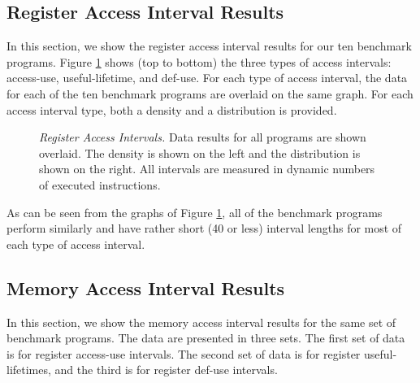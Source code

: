 \documentclass[10pt,dvips]{article}
\begin{document}
\subsection{Register Access Interval Results}
%
In this section, we show the register access interval results for
our ten benchmark programs.
Figure \ref{fig:a_over} shows (top to bottom)
the three types of access intervals:
access-use, useful-lifetime, and def-use.
For each type of access interval, the data for each of the
ten benchmark programs are overlaid on the same graph.
For each access interval type, both a density 
and a distribution is provided.
%
\begin{figure}[tb]
\centering
{}
\caption{{\em Register Access Intervals.} 
Data results for all programs are shown overlaid.
The density is shown on the left and the distribution is shown
on the right.
All intervals are measured in dynamic numbers of executed instructions.}
\label{fig:a_over}
\end{figure}
%
As can be seen from the graphs of Figure \ref{fig:a_over},
all of the benchmark programs perform similarly and have
rather short (40 or less) interval lengths for most of each type
of access interval.
%
%
\subsection{Memory Access Interval Results}
%
In this section, we show the memory access interval results for
the same set of benchmark programs.
The data are presented in three sets.
The first set of data is for register access-use intervals.
The second set of data is for register useful-lifetimes, and
the third is for register def-use intervals.
\end{document}
